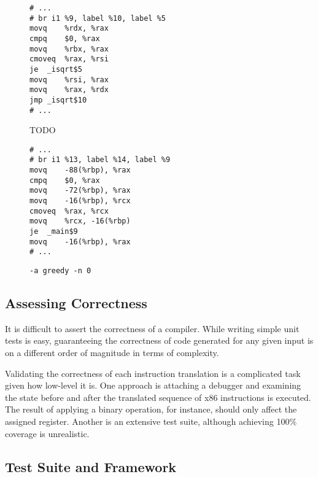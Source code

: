 \documentclass{article}
\begin{document}
\begin{figure}[H]
   \begin{minipage}{0.48\textwidth}
     \centering
     \begin{verbatim}
# ...
# br i1 %9, label %10, label %5
movq	%rdx, %rax
cmpq	$0, %rax
movq	%rbx, %rax
cmoveq	%rax, %rsi
je	_isqrt$5
movq	%rsi, %rax
movq	%rax, %rdx
jmp	_isqrt$10
# ...
     \end{verbatim}
     \caption{TODO}\label{fig:fixed-sqrt1.s}
   \end{minipage}
   \begin{minipage}{0.48\textwidth}
     \centering
     \begin{verbatim}
# ...
# br i1 %13, label %14, label %9
movq	-88(%rbp), %rax
cmpq	$0, %rax
movq	-72(%rbp), %rax
movq	-16(%rbp), %rcx
cmoveq	%rax, %rcx
movq	%rcx, -16(%rbp)
je	_main$9
movq	-16(%rbp), %rax
# ...
     \end{verbatim}
     \caption{\texttt{-a greedy -n 0}}\label{fig:fixed-ind-sqrt1.s}
   \end{minipage}
\end{figure}




%

\subsection{Assessing Correctness}
It is difficult to assert the correctness of a compiler. While writing simple unit tests is easy, guaranteeing the correctness of code generated for any given input is on a different order of magnitude in terms of complexity.

Validating the correctness of each instruction translation is a complicated task given how low-level it is. One approach is attaching a debugger and examining the state before and after the translated sequence of x86 instructions is executed. The result of applying a binary operation,  for instance, should only affect the assigned register. Another is an extensive test suite, although achieving 100\% coverage is unrealistic.

\subsection{Test Suite and  Framework}
\end{document}

